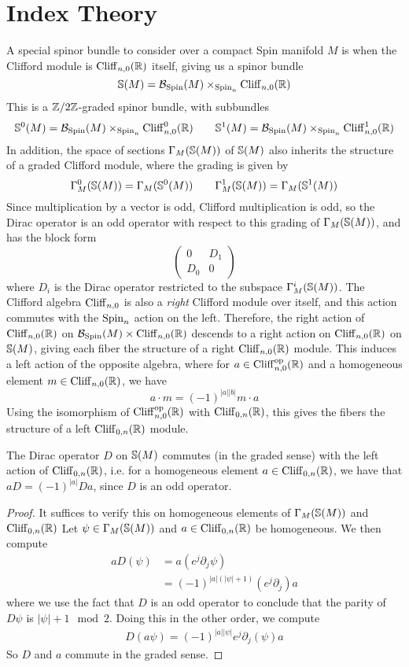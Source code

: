 %
\section{Index Theory}
%
A special spinor bundle to consider over a compact Spin manifold $M$ is when the Clifford
module is $\Cliff_{n,0}(\R)$ itself, giving us a spinor bundle
\[
\S(M) = \B_{\Spin}(M) \times_{\Spin_n} \Cliff_{n,0}(\R)
\]
This is a $\Z/2\Z$-graded spinor bundle, with subbundles
\[
\S^0(M) = \B_{\Spin}(M) \times_{\Spin_n} \Cliff_{n,0}^0(\R) \qquad
\S^1(M) = \B_{\Spin}(M) \times_{\Spin_n} \Cliff_{n,0}^1(\R)
\]
In addition, the space of sections $\Gamma_M(\S(M))$ of $\S(M)$ also inherits the
structure of a graded Clifford module, where the grading is given by
\[
\Gamma_M^0(\S(M)) = \Gamma_M(\S^0(M)) \qquad \Gamma_M^1(\S(M)) = \Gamma_M(\S^1(M))
\]
Since multiplication by a vector is odd, Clifford multiplication is odd, so
the Dirac operator is an odd operator with respect to this grading of $\Gamma_M(\S(M))$,
and has the block form
\[
\begin{pmatrix}
0 & D_1 \\
D_0 & 0
\end{pmatrix}
\]
where $D_i$ is the Dirac operator restricted to the subspace $\Gamma_M^i(\S(M))$.
The Clifford algebra $\Cliff_{n,0}$ is also a \emph{right} Clifford module over
itself, and this action commutes with the $\Spin_n$ action on the left. Therefore,
the right action of $\Cliff_{n,0}(\R)$ on $\B_{\Spin}(M) \times \Cliff_{n,0}(\R)$
descends to a right action on $\Cliff_{n,0}(\R)$ on $\S(M)$, giving each fiber
the structure of a right $\Cliff_{n,0}(\R)$ module. This induces a left action of the
opposite algebra, where for $a \in \Cliff_{n,0}^\mathrm{op}(\R)$ and a homogeneous
element $m \in \Cliff_{n,0}(\R)$, we have
\[
a \cdot m = (-1)^{|a||b|}m \cdot a
\]
Using the isomorphism of $\Cliff_{n,0}^{\mathrm{op}}(\R)$ with $\Cliff_{0,n}(\R)$, this
gives the fibers the structure of a left $\Cliff_{0,n}(\R)$ module.
%
\begin{prop}
The Dirac operator $D$ on $\S(M)$ commutes (in the graded sense) with the left
action of $\Cliff_{0,n}(\R)$, i.e. for a homogeneous element $a \in \Cliff_{0,n}(\R)$,
we have that $aD = (-1)^{|a|} Da$, since $D$ is an odd operator.
\end{prop}
%
\begin{proof}
It suffices to verify this on homogeneous elements of $\Gamma_M(\S(M))$ and
$\Cliff_{0,n}(\R)$ Let $\psi \in \Gamma_M(\S(M))$ and $a \in \Cliff_{0,n}(\R)$ be
homogeneous. We then compute
\begin{align*}
a D(\psi) &= a(e^j\partial_j\psi) \\
&= (-1)^{|a|(|\psi| + 1)} (e^j\partial_j) a
\end{align*}
where we use the fact that $D$ is an odd operator to conclude that the parity of
$D\psi$ is $|\psi| + 1 \mod 2$. Doing this in the other order, we compute
\begin{align*}
D(a\psi) = (-1)^{|a||\psi|}e^j\partial_j(\psi)a
\end{align*}
So $D$ and $a$ commute in the graded sense.
\end{proof}
